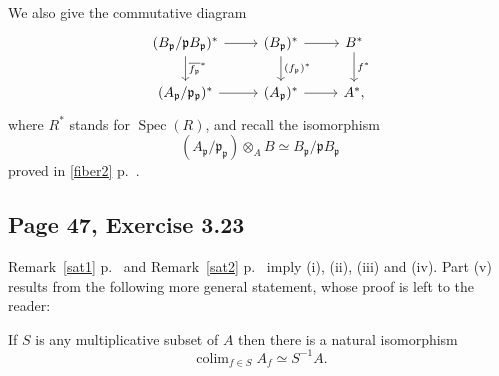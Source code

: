 \documentclass[parskip=half,fontsize=12pt]{scrartcl}%
\newcommand{\mf}{\mathfrak}
\newcommand{\aaa}{\mf a}
\newcommand{\bbb}{\mf b}
\newcommand{\ppp}{\mf p}
\DeclareMathOperator*{\colim}{colim}
\newcommand{\Spec}{\operatorname{Spec}}\newcommand{\Sp}{\operatorname{Spec}}
\newtheorem{rk}[thm]{Remark}
\begin{document}
We also give the commutative diagram
$$
\begin{tikzcd}
(B_\ppp/\ppp B_\ppp)^*\ar[d,"\overline{f_\ppp}^*"]\ar[r]&(B_\ppp)^*\ar[d,"(f_\ppp)^*"]\ar[r]& B^*\ar[d,"f^*"]\\ 
(A_\ppp/\ppp_\ppp)^*\ar[r]&(A_\ppp)^*\ar[r]& A^*,
\end{tikzcd}
$$ 
where $R^*$ stands for $\Spec(R)$, and recall the isomorphism 
$$
(A_\ppp/\ppp_\ppp)\otimes_AB\simeq B_\ppp/\ppp B_\ppp
$$ 
proved in \eqref{fiber2} p.~\pageref{fiber2}. %

\subsection{Page 47, Exercise 3.23}%

\begin{comment}
\begin{rk}\label{sheaf}
Let $f,g\in A$. Then there is at most one $A$-algebra morphism from $A_f$ to $A_g$. Moreover such a morphism exists if and only if $f/1$ is a unit of $A_g$, that is if and only if $f/1$ is contained in no prime prime ideal of $A_g$, that is if and only if $g\notin\ppp$ implies $f\notin\ppp$ for all prime ideal $\ppp$ of $A$, that is if and only if $X_g\subset X_f$. 
\end{rk}
\end{comment}

Remark~\ref{sat1} p.~\pageref{sat1} and Remark~\ref{sat2} p.~\pageref{sat2} imply (i), (ii), (iii) and (iv). Part (v) results from the following more general statement, whose proof is left to the reader:

If $S$ is any multiplicative subset of $A$ then there is a natural isomorphism 
$$
\colim_{f\in S}A_f\simeq S^{-1}A.
$$


\begin{comment}
It seems simpler to proceed as follows:

For $f\in A$ put 
$$
S(f):=A\ \setminus\ \bigcup_{\ppp\notni f}\ \ppp,
$$ 
where it is understood that $\ppp$ is in $X$. Note that $S(f)$ is a multiplicatively closed set depending only on $X_f$, not on $f$. Finally put 
$$
A(X_f):=S(f)^{-1}A.
$$ 
Here is a mild generalization: 

For each radical ideal $\aaa$ of $A$ put 
$$
S_\aaa:=A\ \setminus\ \bigcup_{\ppp\not\supset\aaa}\ \ppp.
$$ 
This is multiplicatively closed. For $\aaa\subset\bbb$ we have a natural morphism $S_{\bbb}^{-1}A\to S_\aaa^{-1}A$. We also have a canonical isomorphism 
$$
\colim_{\aaa\not\subset\ppp}S_\aaa^{-1}A\simeq A_\ppp.
$$
\end{comment}
\end{document}
